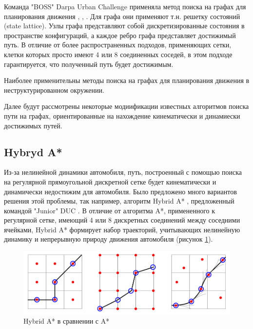 Команда "BOSS" Darpa Urban Challenge применяла метод поиска на графах для планирования движения \cite{darpa_boss},
\cite{darpa_boss_2}, \cite{darpa_boss_3}. Для графа они применяют т.н. решетку состояний (state lattice). Узлы
графа представляют собой дискретизированные состояния в пространстве конфигураций, а каждое ребро графа представляет
достижимый путь. В отличие от более распространенных подходов, применяющих сетки, клетки которых просто имеют 4
или 8 соединенных соседей, в этом подходе гарантируется, что полученный путь будет достижимым.

Наиболее применительны методы поиска на графах для планирования движения в неструктурированном окружении.

Далее будут рассмотрены некоторые модиификации известных алгоритмов поиска пути на графах, ориентированные на
нахождение кинематически и динамиески достижимых путей.

\subsection{Hybryd A*}
Из-за нелинейной динамики автомобиля, путь, построенный с помощью поиска на
регулярной прямоугольной дискретной сетке будет кинематически и динамически недостижим для автомобиля.
Было предложено много вариантов решения этой проблемы, так например, алгоритм Hybrid A*
\cite{motion_planning_hybrid_a_star}, предложенный командой "Junior" DUC \cite{darpa_junior}.
В отличие от алгоритма A*, примененного к регулярной сетке, имеющий 4 или 8 дискретных соединений между соседними
ячейками, Hybrid A* формирует набор траекторий, учитывающих нелинейную динамику и непрерывную природу движения
автомобиля (рисунок \ref{img:hybrid_a_star}).

\begin{figure}[h]
    \centering
    \includegraphics[]{images/hybrid_a_star}
    \caption{Hybrid A* в сравнении с A* \cite{darpa_junior}}
    \label{img:hybrid_a_star}
\end{figure}

